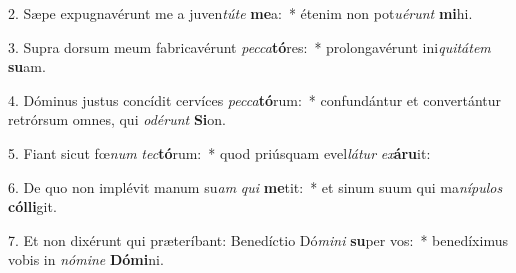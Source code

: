 2. Sæpe expugnavérunt me a juven\textit{tú}\textit{te} \textbf{me}a:~*  étenim non pot\textit{u}\textit{é}\textit{runt} \textbf{mi}hi.\

3. Supra dorsum meum fabricavérunt \textit{pec}\textit{ca}\textbf{tó}res:~*  prolongavérunt ini\textit{qui}\textit{tá}\textit{tem} \textbf{su}am.\

4. Dóminus justus concídit cervíces \textit{pec}\textit{ca}\textbf{tó}rum:~*  confundántur et convertántur retrórsum omnes, qui \textit{o}\textit{dé}\textit{runt} \textbf{Si}on.\

5. Fiant sicut fœ\textit{num} \textit{tec}\textbf{tó}rum:~*  quod priúsquam evel\textit{lá}\textit{tur} \textit{ex}\textbf{á}\textbf{ru}it:\

6. De quo non implévit manum su\textit{am} \textit{qui} \textbf{me}tit:~*  et sinum suum qui ma\textit{ní}\textit{pu}\textit{los} \textbf{cól}\textbf{li}git.\

7. Et non dixérunt qui præteríbant: Benedíctio Dó\textit{mi}\textit{ni} \textbf{su}per vos:~*  benedíximus vobis in \textit{nó}\textit{mi}\textit{ne} \textbf{Dó}\textbf{mi}ni.\

